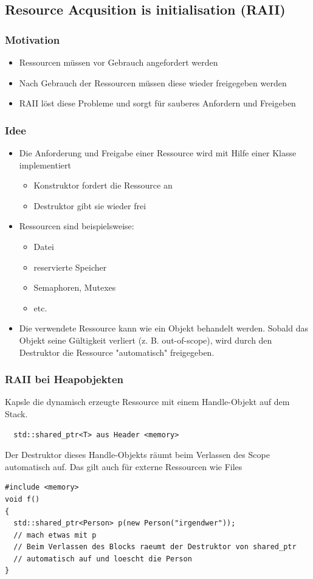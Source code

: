 \subsection{Resource Acqusition is initialisation (RAII)}
\begin{multicols}{2}
  \subsubsection{Motivation}
  \begin{itemize}
    \item Ressourcen müssen vor Gebrauch angefordert werden
    \item Nach Gebrauch der Ressourcen müssen diese wieder freigegeben werden
    \item RAII löst diese Probleme und sorgt für sauberes Anfordern und Freigeben
  \end{itemize}
  \vfill\null
  \columnbreak
  \subsubsection{Idee}
  \begin{itemize}
    \item Die Anforderung und Freigabe einer Ressource wird mit Hilfe einer Klasse implementiert
    \begin{itemize}
      \item  Konstruktor fordert die Ressource an
      \item  Destruktor gibt sie wieder frei
    \end{itemize}
    \item Ressourcen sind beispielsweise:
    \begin{itemize}
      \item Datei
      \item reservierte Speicher
      \item Semaphoren, Mutexes
      \item etc.
    \end{itemize}
    \item Die verwendete Ressource kann wie ein Objekt behandelt werden. Sobald das Objekt seine Gültigkeit 
    verliert (z. B. out-of-scope), wird durch den Destruktor die Ressource "automatisch" freigegeben.
  \end{itemize}
\end{multicols}
\newpage
\subsubsection{RAII bei Heapobjekten}
Kapsle die dynamisch erzeugte Ressource mit einem Handle-Objekt auf dem Stack.
\begin{lstlisting}
  std::shared_ptr<T> aus Header <memory>
\end{lstlisting}
Der Destruktor dieses Handle-Objekts räumt beim Verlassen des Scope automatisch auf. Das gilt auch für 
externe Ressourcen wie Files
\begin{lstlisting}
#include <memory>
void f()
{
  std::shared_ptr<Person> p(new Person("irgendwer"));
  // mach etwas mit p
  // Beim Verlassen des Blocks raeumt der Destruktor von shared_ptr
  // automatisch auf und loescht die Person
}
\end{lstlisting}


